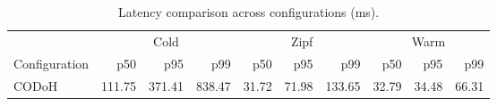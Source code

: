 \begin{table}[t]
\centering
\caption{Latency comparison across configurations (ms).}
\label{tab:comparison}
\small
\begin{tabular}{l rrr rrr rrr}
\toprule
 & \multicolumn{3}{c}{Cold} & \multicolumn{3}{c}{Zipf} & \multicolumn{3}{c}{Warm} \\
\cmidrule(lr){2-4} \cmidrule(lr){5-7} \cmidrule(lr){8-10}
Configuration & p50 & p95 & p99 & p50 & p95 & p99 & p50 & p95 & p99 \\
\midrule
CODoH & 111.75 & 371.41 & 838.47 & 31.72 & 71.98 & 133.65 & 32.79 & 34.48 & 66.31 \\
\bottomrule
\end{tabular}
\end{table}
